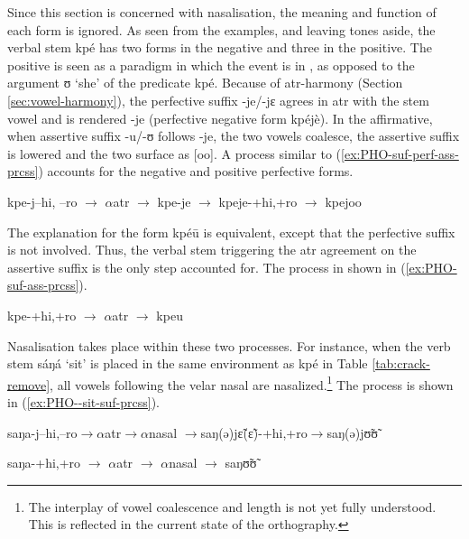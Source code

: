Since this section is concerned with nasalisation, the meaning and function of each form is ignored. As seen from the examples, and leaving tones aside, the verbal stem {\sls kpé} has two forms in the negative and three in the positive. The positive is seen as a paradigm in which the event is in , as opposed to the argument {\sls ʊ} `she' of the predicate {\sls kpé}. Because of {\sc atr}-harmony (Section \ref{sec:vowel-harmony}), the perfective suffix {\sls -je/-jɛ} agrees in {\sc atr} with the stem vowel and is rendered {\sls -je} (perfective negative form {\sls kpéjè}). In the affirmative,  when assertive suffix  {\sls -u/-ʊ}  follows {\sls  -je}, the two vowels coalesce, the assertive suffix is lowered and the two  surface as [{oo}]. A process similar to (\ref{ex:PHO-suf-perf-ass-prcss})  accounts for the negative and positive perfective forms.

\begin{exe}
\ex\label{ex:PHO-suf-perf-ass-prcss}
kpe-j{\ob}{\sc  --hi, --ro}{\cb}  $\rightarrow$  $\alpha${\sc atr} $\rightarrow$ kpe-je 
 $\rightarrow$
kpeje-{\ob}{\sc +hi,+ro}{\cb}  $\rightarrow$  kpejoo
\end{exe}

The explanation for the form {\sls kpéū} is equivalent, except that the
perfective suffix is not involved. Thus,  the verbal stem triggering the {\sc
atr} agreement on the assertive suffix is the only step  accounted
for. The process in shown in (\ref{ex:PHO-suf-ass-prcss}).


\begin{exe}
\ex\label{ex:PHO-suf-ass-prcss}
kpe-{\ob}{\sc +hi,+ro}{\cb}  $\rightarrow$  $\alpha${\sc atr} $\rightarrow$ kpeu
\end{exe}


Nasalisation takes place within these two processes. For instance, when the verb stem {\sls sáŋá} `sit' is placed in the same environment as {\sls kpé} in Table \ref{tab:crack-remove}, all vowels following the velar nasal are nasalized.\footnote{The interplay of vowel coalescence and  length is not yet fully understood. This is reflected in the current state of the orthography.}  The process is shown in (\ref{ex:PHO--sit-suf-prcss}).

\begin{exe}
\ex\label{ex:PHO--sit-suf-prcss}
\begin{xlist}

\ex\label{ex:PHO-sit-suf-perf-ass-prcss}
 saŋa-j{\ob}{\sc  --hi,--ro}{\cb}$\rightarrow\!\alpha${\sc atr}$\rightarrow\!\alpha${\sc nasal}
$\rightarrow$saŋ(ə)jɛ̃(ɛ̃)-{\ob}{\sc +hi,+ro}{\cb}$\rightarrow$saŋ(ə)jʊ̃ʊ̃

\ex\label{ex:PHO--sit-suf-ass-prcss}
saŋa-{\ob}{\sc +hi,+ro}{\cb}   $\rightarrow$  $\alpha${\sc atr}  $\rightarrow$  
$\alpha${\sc nasal} $\rightarrow$ saŋʊ̃ʊ̃
\end{xlist}
\end{exe}

